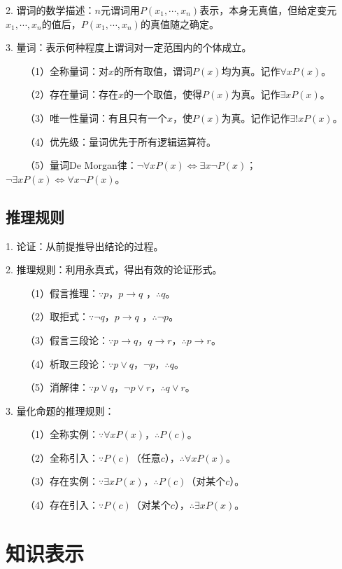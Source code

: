 2. 谓词的数学描述：$n$元谓词用$P(x_1,\cdots,x_n)$表示，本身无真值，但给定变元$x_1,\cdots,x_n$的值后，$P(x_1,\cdots,x_n)$的真值随之确定。

3. 量词：表示何种程度上谓词对一定范围内的个体成立。

~~~~（1）全称量词：对$x$的所有取值，谓词$P(x)$均为真。记作$\forall x P(x)$。

~~~~（2）存在量词：存在$x$的一个取值，使得$P(x)$为真。记作$\exists x P(x)$。

~~~~（3）唯一性量词：有且只有一个$x$，使$P(x)$为真。记作记作$\exists! x P(x)$。
    
~~~~（4）优先级：量词优先于所有逻辑运算符。

~~~~（5）量词De Morgan律：$\neg \forall x P(x)\Leftrightarrow \exists x \neg P(x)$；$\neg \exists x P(x)\Leftrightarrow \forall x \neg P(x)$。

\subsection{推理规则}

1. 论证：从前提推导出结论的过程。

2. 推理规则：利用永真式，得出有效的论证形式。

~~~~（1）假言推理：$\because p$，$ p \rightarrow q$ ，$ \therefore q$。

~~~~（2）取拒式：$\because \neg q$，$ p \rightarrow q$ ，$ \therefore \neg p$。

~~~~（3）假言三段论：$\because p \rightarrow q$，$q \rightarrow r$，$\therefore p \rightarrow r$。

~~~~（4）析取三段论：$\because p \vee q $，$\neg p$，$\therefore q$。

~~~~（5）消解律：$\because p \vee q$，$\neg p \vee r$，$\therefore q \vee r$。

3. 量化命题的推理规则：

~~~~（1）全称实例：$\because \forall x P(x)$，$ \therefore P(c)$。

~~~~（2）全称引入：$\because P(c)$（任意$c$），$ \therefore \forall x P(x)$。

~~~~（3）存在实例：$\because \exists x P(x)$，$ \therefore P(c)$（对某个$c$）。

~~~~（4）存在引入：$\because P(c)$（对某个$c$），$ \therefore \exists x P(x)$。


\section{知识表示}

